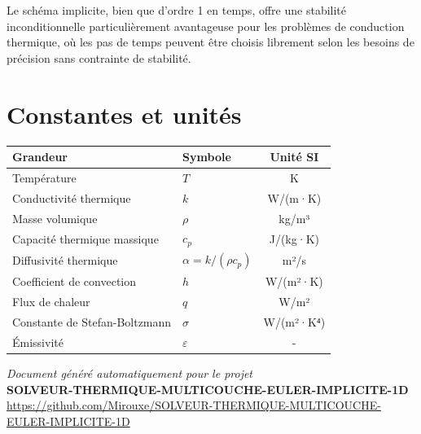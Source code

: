 \documentclass[11pt,a4paper]{article}
\begin{document}
Le schéma implicite, bien que d'ordre 1 en temps, offre une stabilité inconditionnelle particulièrement avantageuse pour les problèmes de conduction thermique, où les pas de temps peuvent être choisis librement selon les besoins de précision sans contrainte de stabilité.

\appendix
\section{Constantes et unités}

\begin{center}
\begin{tabular}{llc}
\toprule
\textbf{Grandeur} & \textbf{Symbole} & \textbf{Unité SI} \\
\midrule
Température & $T$ & K \\
Conductivité thermique & $k$ & W/(m·K) \\
Masse volumique & $\rho$ & kg/m³ \\
Capacité thermique massique & $c_p$ & J/(kg·K) \\
Diffusivité thermique & $\alpha = k/(\rho c_p)$ & m²/s \\
Coefficient de convection & $h$ & W/(m²·K) \\
Flux de chaleur & $q$ & W/m² \\
Constante de Stefan-Boltzmann & $\sigma$ & W/(m²·K⁴) \\
Émissivité & $\varepsilon$ & - \\
\bottomrule
\end{tabular}
\end{center}

\vspace{1cm}
\begin{center}
\textit{Document généré automatiquement pour le projet}\\
\textbf{SOLVEUR-THERMIQUE-MULTICOUCHE-EULER-IMPLICITE-1D}\\
\url{https://github.com/Mirouxe/SOLVEUR-THERMIQUE-MULTICOUCHE-EULER-IMPLICITE-1D}
\end{center}
\end{document}
